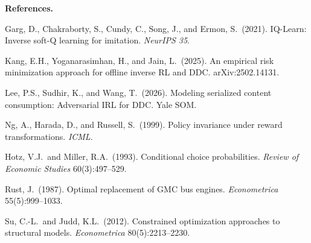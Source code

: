 \documentclass[10pt]{article}
\begin{document}
\bigskip\noindent\textbf{References.}

\smallskip\noindent Garg, D., Chakraborty, S., Cundy, C., Song, J., and Ermon, S.\ (2021). IQ-Learn: Inverse soft-Q learning for imitation. \textit{NeurIPS 35}.

\smallskip\noindent Kang, E.H., Yoganarasimhan, H., and Jain, L.\ (2025). An empirical risk minimization approach for offline inverse RL and DDC. arXiv:2502.14131.

\smallskip\noindent Lee, P.S., Sudhir, K., and Wang, T.\ (2026). Modeling serialized content consumption: Adversarial IRL for DDC. Yale SOM.

\smallskip\noindent Ng, A., Harada, D., and Russell, S.\ (1999). Policy invariance under reward transformations. \textit{ICML}.

\smallskip\noindent Hotz, V.J.\ and Miller, R.A.\ (1993). Conditional choice probabilities. \textit{Review of Economic Studies} 60(3):497--529.

\smallskip\noindent Rust, J.\ (1987). Optimal replacement of GMC bus engines. \textit{Econometrica} 55(5):999--1033.

\smallskip\noindent Su, C.-L.\ and Judd, K.L.\ (2012). Constrained optimization approaches to structural models. \textit{Econometrica} 80(5):2213--2230.
\end{document}
